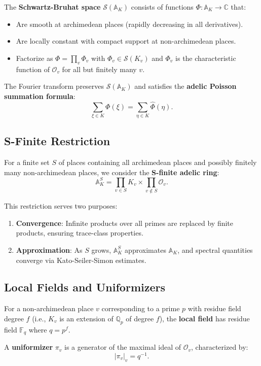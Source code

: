 The \textbf{Schwartz-Bruhat space} $\mathcal{S}(\mathbb{A}_K)$ consists of functions $\Phi: \mathbb{A}_K \to \mathbb{C}$ that:
\begin{itemize}
  \item Are smooth at archimedean places (rapidly decreasing in all derivatives).
  \item Are locally constant with compact support at non-archimedean places.
  \item Factorize as $\Phi = \prod_v \Phi_v$ with $\Phi_v \in \mathcal{S}(K_v)$ and $\Phi_v$ is the characteristic function of $\mathcal{O}_v$ for all but finitely many $v$.
\end{itemize}

The Fourier transform preserves $\mathcal{S}(\mathbb{A}_K)$ and satisfies the \textbf{adelic Poisson summation formula}:
\[
\sum_{\xi \in K} \Phi(\xi) = \sum_{\eta \in K} \hat{\Phi}(\eta).
\]

\subsection{S-Finite Restriction}

For a finite set $S$ of places containing all archimedean places and possibly finitely many non-archimedean places, we consider the \textbf{S-finite adelic ring}:
\[
\mathbb{A}_K^S = \prod_{v \in S} K_v \times \prod_{v \notin S} \mathcal{O}_v.
\]

This restriction serves two purposes:
\begin{enumerate}
  \item \textbf{Convergence}: Infinite products over all primes are replaced by finite products, ensuring trace-class properties.
  \item \textbf{Approximation}: As $S$ grows, $\mathbb{A}_K^S$ approximates $\mathbb{A}_K$, and spectral quantities converge via Kato-Seiler-Simon estimates.
\end{enumerate}

\subsection{Local Fields and Uniformizers}

For a non-archimedean place $v$ corresponding to a prime $p$ with residue field degree $f$ (i.e., $K_v$ is an extension of $\mathbb{Q}_p$ of degree $f$), the \textbf{local field} has residue field $\mathbb{F}_q$ where $q = p^f$. 

A \textbf{uniformizer} $\pi_v$ is a generator of the maximal ideal of $\mathcal{O}_v$, characterized by:
\[
|\pi_v|_v = q^{-1}.
\]

